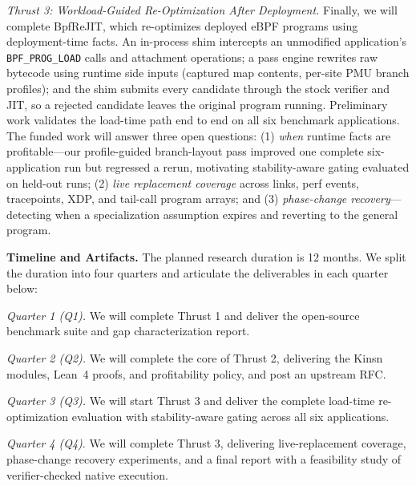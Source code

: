 \textit{Thrust 3: Workload-Guided Re-Optimization After Deployment.}
Finally, we will complete BpfReJIT, which re-optimizes deployed eBPF programs using deployment-time facts.  An in-process shim intercepts an unmodified application's \texttt{BPF\_PROG\_LOAD} calls and attachment operations; a pass engine rewrites raw bytecode using runtime side inputs (captured map contents, per-site PMU branch profiles); and the shim submits every candidate through the stock verifier and JIT, so a rejected candidate leaves the original program running.  Preliminary work validates the load-time path end to end on all six benchmark applications.  The funded work will answer three open questions: (1) \textit{when} runtime facts are profitable---our profile-guided branch-layout pass improved one complete six-application run but regressed a rerun, motivating stability-aware gating evaluated on held-out runs; (2) \textit{live replacement coverage} across links, perf events, tracepoints, XDP, and tail-call program arrays; and (3) \textit{phase-change recovery}---detecting when a specialization assumption expires and reverting to the general program.

\noindent \textbf{Timeline and Artifacts.} The planned research duration is 12 months.  We split the duration into four quarters and articulate the deliverables in each quarter below:

\textit{Quarter 1 (Q1).} We will complete Thrust 1 and deliver the open-source benchmark suite and gap characterization report.

\textit{Quarter 2 (Q2).} We will complete the core of Thrust 2, delivering the Kinsn modules, Lean~4 proofs, and profitability policy, and post an upstream RFC.

\textit{Quarter 3 (Q3).} We will start Thrust 3 and deliver the complete load-time re-optimization evaluation with stability-aware gating across all six applications.

\textit{Quarter 4 (Q4)}. We will complete Thrust 3, delivering live-replacement coverage, phase-change recovery experiments, and a final report with a feasibility study of verifier-checked native execution.

